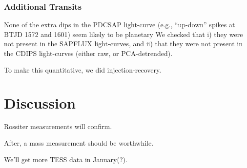 \documentclass[12pt,twocolumn,tighten]{aastex62}
\begin{document}
\subsubsection{Additional Transits}

None of the extra dips in the PDCSAP light-curve (e.g., ``up-down''
spikes at BTJD 1572 and 1601) seem likely to be planetary
We checked that i) they were not present in the SAPFLUX light-curves,
and ii) that they were not present in the CDIPS light-curves (either
raw, or PCA-detrended).

To make this quantitative, we did injection-recovery.



\section{Discussion}
\label{sec:discussion}

Rossiter measurements will confirm.

After, a mass measurement should be worthwhile.

We'll get more TESS data in January(?).




\end{document}

